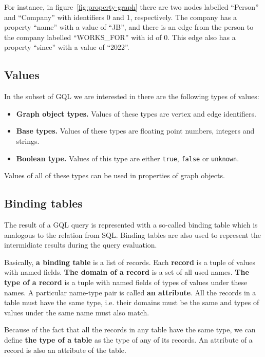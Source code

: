 \documentclass[14pt]{constructor-thesis}
\theoremstyle{definition}
\begin{document}
For instance, in figure~\ref{fig:property-graph} there are two nodes labelled ``Person'' and ``Company'' with identifiers 0 and 1, respectively. The company has a property ``name'' with a value of ``JB'', and there is an edge from the person to the company labelled ``WORKS\_FOR'' with id of 0. This edge also has a property ``since'' with a value of ``2022''.

\subsection{Values}
\label{section:intro-values}

In the subset of GQL we are interested in there are the following types of values:
\begin{itemize}
  \item \textbf{Graph object types.} Values of these types are vertex and edge identifiers.
  \item \textbf{Base types.} Values of these types are floating point numbers, integers and strings. 
  \item \textbf{Boolean type.} Values of this type are either \texttt{true}, \texttt{false} or \texttt{unknown}.
\end{itemize}

Values of all of these types can be used in properties of graph objects.

\subsection{Binding tables}
\label{section:intro-binding-tables}

The result of a GQL query is represented with a so-called binding table which is analogous to the relation from SQL. Binding tables are also used to represent the intermidiate results during the query evaluation.

Basically, \textbf{a binding table} is a list of records. Each \textbf{record} is a tuple of values with named fields. \textbf{The domain of a record} is a set of all used names. \textbf{The type of a record} is a tuple with named fields of types of values under these names. A particular name-type pair is called \textbf{an attribute}. All the records in a table must have the same type, i.e. their domains must be the same and types of values under the same name must also match.

Because of the fact that all the records in any table have the same type, we can define \textbf{the type of a table} as the type of any of its records. An attribute of a record is also an attribute of the table.
\end{document}
